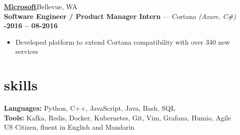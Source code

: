 \documentclass[margin,10.5pt]{res}
\begin{document}
\begin{resume}
    \href{https://careers.microsoft.com/professionals/us/en/c-engineering}{\textbf{\large {}  Microsoft}}\hfill Bellevue, WA\\
    \textbf{Software Engineer / Product Manager Intern} --- Cortana
    \textit{(Azure, C\#)}\hfill
    \textsc{\bfseries{}-2016 -- 08-2016}
    \vspace{0.5em}
    \begin{itemize}
        \item Developed platform to extend Cortana compatibility with over 340 new services
    \end{itemize}

\vspace{8pt}

\section{\sc \lsstyle skills}
    \textbf{Languages:}
    Python, C++, JavaScript, Java, Bash, SQL\\
    \textbf{Tools:} Kafka, Redis, Docker, Kubernetes, Git, Vim, Grafana, Humio, Agile \\
    US Citizen, fluent in English and Mandarin
\end{resume}

\vspace{8pt}
\end{document}
